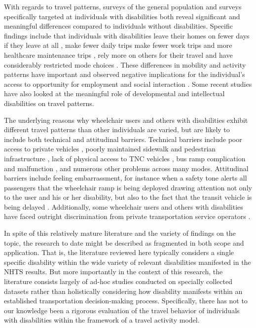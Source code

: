 \documentclass[3p, authoryear, review]{elsarticle} %
\begin{document}
With regards to travel patterns, surveys of the general population and surveys
specifically targeted at individuals with disabilities both reveal significant and
meaningful differences compared to individuals without disabilities. Specific
findings include that individuals with disabilities leave their homes on fewer
days if they leave at all \citep{Sweeney2004}, make fewer daily trips \citep{Schmocker2005, Brumbaugh2018} make fewer work trips and more healthcare maintenance trips
\citep{Ermagun2016}, rely more on others for their travel \citep{Sweeney2004}
and have considerably restricted mode choices \citep{Rosenbloom2007, Ruvolo2020}.
These differences in mobility and activity patterns have important and observed
negative implications for the individual's access to opportunity for employment
\citep{Rosenbloom2007, Lubin2012} and social interaction \citep{Bascom2017, Velho2016}.
Some recent studies have also looked at the meaningful role of developmental \citep{Wasfi2007}
and intellectual \citep{Feeley2019} disabilities on travel patterns.

The underlying reasons why wheelchair users and others with disabilities exhibit
different travel patterns than other individuals are varied, but are
likely to include both technical and attitudinal barriers. Technical barriers
include poor access to private vehicles
\citep{VanRoosmalen2010}, poorly maintained sidewalk and pedestrian infrastructure
\citep{frackelton2013measuring}, lack of physical access to TNC
vehicles \citep{Ruvolo2020}, bus ramp complication and malfunction \citep{Velho2016},
and numerous other problems across many modes.
Attitudinal barriers include feeling embarrassment, for instance when a safety
tone alerts all passengers that the wheelchair ramp is being deployed drawing
attention not only to the user and his or her disability, but also to the fact that the
transit vehicle is being delayed \citep{Velho2016}. Additionally, some wheelchair users
and others with disabilities have faced outright discrimination from private
transportation service operators \citep{Bascom2017}.

In spite of this relatively mature literature and the variety of findings on the
topic, the research to date might be described as fragmented in both scope and
application. That is, the literature reviewed here typically considers a single
specific disability within the wide variety of relevant disabilities manifested
in the NHTS results. But more importantly in the context of this research, the
literature consists largely of ad-hoc studies conducted on specially
collected datasets rather than holistically considering how disability manifests
within an established transportation decision-making process. Specifically,
there has not to our knowledge been a rigorous evaluation of the travel behavior
of individuals with disabilities within the framework of a travel activity
model.
\end{document}

